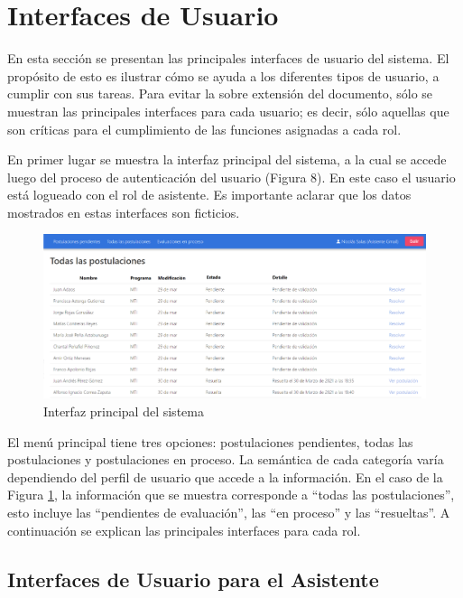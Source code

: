 \section{Interfaces de Usuario}

En esta sección se presentan las principales interfaces de usuario del sistema.
El propósito de esto es ilustrar cómo se ayuda a los diferentes tipos de
usuario, a cumplir con sus tareas. Para evitar la sobre extensión del documento,
sólo se muestran las principales interfaces para cada usuario; es decir, sólo
aquellas que son críticas para el cumplimiento de las funciones asignadas a cada
rol.

En primer lugar se muestra la interfaz principal del sistema, a la cual se
accede luego del proceso de autenticación del usuario (Figura 8). En este caso
el usuario está logueado con el rol de asistente. Es importante aclarar que los
datos mostrados en estas interfaces son ficticios.

\begin{figure}[!ht]
    \begin{center}
        \includegraphics[scale=0.23]{imagenes/04-interfaz-principal.png}
    \end{center}
    \caption{Interfaz principal del sistema}
    \label{fig:interfaz-principal}
\end{figure}

El menú principal tiene tres opciones: postulaciones pendientes, todas las
postulaciones y postulaciones en proceso. La semántica de cada categoría varía
dependiendo del perfil de usuario que accede a la información. En el caso de la
Figura \ref{fig:interfaz-principal}, la información que se muestra corresponde a
“todas las postulaciones”, esto incluye las “pendientes de evaluación”, las “en
proceso” y las “resueltas”. A continuación se explican las principales
interfaces para cada rol.

\subsection{Interfaces de Usuario para el Asistente}

